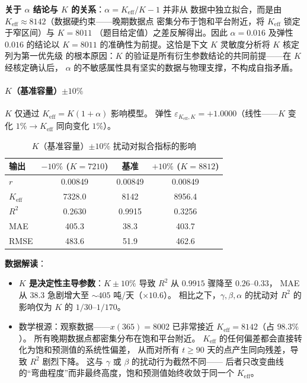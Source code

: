 \documentclass[12pt,a4paper]{ctexart}
\begin{document}
\begin{table}[htbp]
\textbf{关于 $\alpha$ 结论与 $K$ 的关系}：$\alpha = K_{\text{eff}}/K - 1$ 并非从
数据中独立拟合，而是由 $K_{\text{eff}} \approx 8142$（数据硬约束——晚期数据点
密集分布于饱和平台附近，将 $K_{\text{eff}}$ 锁定于窄区间）与 $K = 8011$
（题目给定值）之差反解得出。因此 $\alpha = 0.016$ 及弹性 $0.016$ 的结论以
$K = 8011$ 的准确性为前提。这恰是下文 $K$ 灵敏度分析将 $K$ 核定列为第一优先级
的根本原因：$K$ 的验证是所有衍生参数结论的共同前提——在 $K$ 经核定确认后，
$\alpha$ 的不敏感属性具有坚实的数据与物理支撑，不构成自指矛盾。

\paragraph{$K$（基准容量）$\pm 10\%$}

$K$ 仅通过 $K_{\text{eff}} = K(1+\alpha)$ 影响模型。
弹性 $\varepsilon_{K_{\text{eff}},K} = +1.0000$（线性——$K$ 变化 $1\% \to K_{\text{eff}}$ 同向变化 $1\%$）。

\begin{table}[htbp]
\centering
\caption{$K$（基准容量）$\pm 10\%$ 扰动对拟合指标的影响}
\label{tab:sens_K}
\begin{tabular}{lccc}
\toprule
输出 & $-10\%$ ($K = 7210$) & 基准 & $+10\%$ ($K = 8812$) \\
\midrule
$r$      & 0.00849 & 0.00849 & 0.00849 \\
$K_{\text{eff}}$ & 7328.0 & 8142 & 8956.4 \\
$R^2$    & 0.2630 & 0.9915 & 0.3256 \\
MAE      & 405.3 & 38.3 & 403.7 \\
RMSE     & 483.6 & 51.9 & 462.6 \\
\bottomrule
\end{tabular}
\end{table}

\textbf{数据解读}：
\begin{itemize}
  \item \textbf{$K$ 是决定性主导参数}：$K \pm 10\%$ 导致 $R^2$ 从 $0.9915$ 骤降至 $0.26$--$0.33$，
        MAE 从 $38.3$ 急剧增大至 $\sim 405$ 吨/天（$\times 10.6$）。
        相比之下，$\gamma, \beta, \alpha$ 的扰动对 $R^2$ 的影响仅为 $K$ 的 $1/30$--$1/170$。
  \item 数学根源：观察数据——$x(365) = 8002$ 已非常接近 $K_{\text{eff}} = 8142$（占 $98.3\%$）。
        所有晚期数据点都密集分布在饱和平台附近。
        $K_{\text{eff}}$ 的任何偏差都会直接转化为饱和预测值的系统性偏差，
        从而对所有 $t \geq 90$ 天的点产生同向残差，导致 $R^2$ 剧烈下降。
        这与 $\gamma$ 或 $\beta$ 的扰动行为截然不同——
        后者只改变曲线的``弯曲程度''而非最终高度，饱和预测值始终收敛于同一个 $K_{\text{eff}}$。


\end{itemize}
\end{table}
\end{document}
